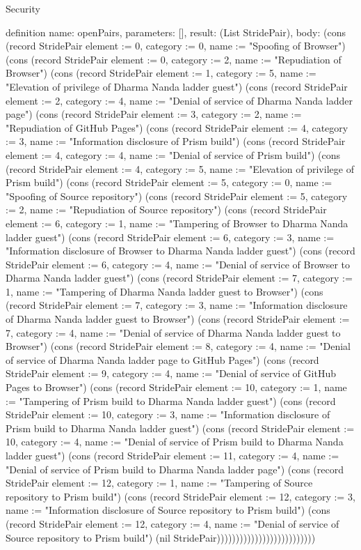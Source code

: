 \begin{lexlean}{Security}
\begin{semanticmodule}
definition{
  name: openPairs,
  parameters: [],
  result: (List StridePair),
  body: (cons (record StridePair {element := 0, category := 0, name := "Spoofing of Browser"}) (cons (record StridePair {element := 0, category := 2, name := "Repudiation of Browser"}) (cons (record StridePair {element := 1, category := 5, name := "Elevation of privilege of Dharma Nanda ladder guest"}) (cons (record StridePair {element := 2, category := 4, name := "Denial of service of Dharma Nanda ladder page"}) (cons (record StridePair {element := 3, category := 2, name := "Repudiation of GitHub Pages"}) (cons (record StridePair {element := 4, category := 3, name := "Information disclosure of Prism build"}) (cons (record StridePair {element := 4, category := 4, name := "Denial of service of Prism build"}) (cons (record StridePair {element := 4, category := 5, name := "Elevation of privilege of Prism build"}) (cons (record StridePair {element := 5, category := 0, name := "Spoofing of Source repository"}) (cons (record StridePair {element := 5, category := 2, name := "Repudiation of Source repository"}) (cons (record StridePair {element := 6, category := 1, name := "Tampering of Browser to Dharma Nanda ladder guest"}) (cons (record StridePair {element := 6, category := 3, name := "Information disclosure of Browser to Dharma Nanda ladder guest"}) (cons (record StridePair {element := 6, category := 4, name := "Denial of service of Browser to Dharma Nanda ladder guest"}) (cons (record StridePair {element := 7, category := 1, name := "Tampering of Dharma Nanda ladder guest to Browser"}) (cons (record StridePair {element := 7, category := 3, name := "Information disclosure of Dharma Nanda ladder guest to Browser"}) (cons (record StridePair {element := 7, category := 4, name := "Denial of service of Dharma Nanda ladder guest to Browser"}) (cons (record StridePair {element := 8, category := 4, name := "Denial of service of Dharma Nanda ladder page to GitHub Pages"}) (cons (record StridePair {element := 9, category := 4, name := "Denial of service of GitHub Pages to Browser"}) (cons (record StridePair {element := 10, category := 1, name := "Tampering of Prism build to Dharma Nanda ladder guest"}) (cons (record StridePair {element := 10, category := 3, name := "Information disclosure of Prism build to Dharma Nanda ladder guest"}) (cons (record StridePair {element := 10, category := 4, name := "Denial of service of Prism build to Dharma Nanda ladder guest"}) (cons (record StridePair {element := 11, category := 4, name := "Denial of service of Prism build to Dharma Nanda ladder page"}) (cons (record StridePair {element := 12, category := 1, name := "Tampering of Source repository to Prism build"}) (cons (record StridePair {element := 12, category := 3, name := "Information disclosure of Source repository to Prism build"}) (cons (record StridePair {element := 12, category := 4, name := "Denial of service of Source repository to Prism build"}) (nil StridePair))))))))))))))))))))))))))
}


\end{semanticmodule}
\end{lexlean}
